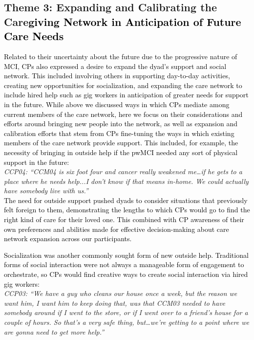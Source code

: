 \documentclass[acmsmall]{acmart}
\begin{document}
\subsection{Theme 3: Expanding and Calibrating the Care\textcolor{black}{giving Network in Anticipation of Future Care Needs}}

\textcolor{black}{Related to \textcolor{black}{their} uncertainty about the future due to the progressive nature of MCI, CPs also expressed a desire to expand the dyad’s support and social network. This included involving others in supporting day-to-day activities, creating new opportunities for socialization, and expanding the care network to include hired help such as gig workers in anticipation of greater needs for support in the future. While above we discussed ways in which CPs mediate among current members of the care network, here we focus on their considerations and efforts around bringing new people into the network, as well as expansion and calibration efforts that stem from CPs fine\textcolor{black}{-}tuning the ways in which existing members of the care network provide support. This included, for example, the necessity of bringing in outside help if the pwMCI needed any sort of physical support in the future:}
\\

\textit{CCP04: “CCM04 is six foot four and cancer really weakened me…if he gets to a place where he needs help...I don't know if that means in-home. We could actually have somebody live with us.”}
\\

\textcolor{black}{The need for outside support pushed dyads to consider situations that previously felt foreign to them, demonstrating the lengths to which CPs would go to find the right kind of care for their loved one. This combined with CP awareness of their own preferences and abilities made for effective decision-making about care network expansion across our participants.}

\textcolor{black}{Socialization was another commonly sought form of new outside help. Traditional forms of social interaction were not always a manageable form of engagement to orchestrate, so CPs would find creative ways to create social interaction via hired gig workers:}
\\

\textit{CCP03: “We have a guy who cleans our house once a week, but the reason we want him, I want him to keep doing that, was that CCM03 needed to have somebody around if I went to the store, or if I went over to a friend's house for a couple of hours. So that's a very safe thing, but…we're getting to a point where we are gonna need to get more help.”}
\\
\end{document}

